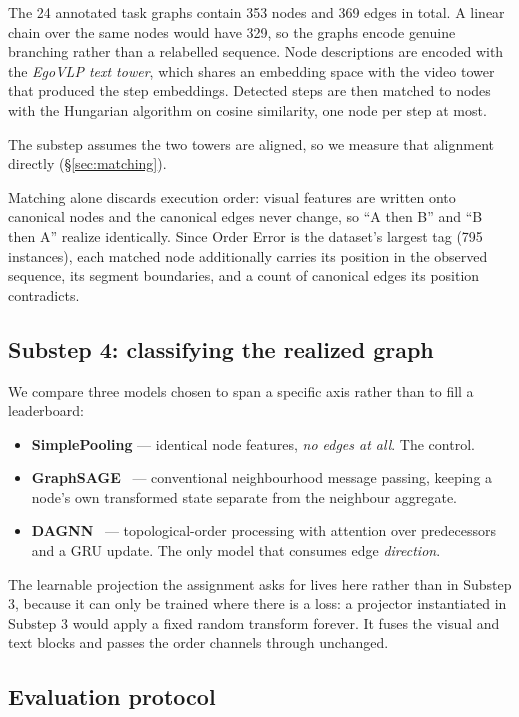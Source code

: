 \documentclass[10pt,twocolumn,letterpaper]{article}
\begin{document}
The 24 annotated task graphs contain 353 nodes and 369 edges in total. A linear
chain over the same nodes would have 329, so the graphs encode genuine branching
rather than a relabelled sequence. Node descriptions are encoded with the
\emph{EgoVLP text tower}, which shares an embedding space with the video tower
that produced the step embeddings. Detected steps are then matched to nodes with
the Hungarian algorithm on cosine similarity, one node per step at most.

The substep assumes the two towers are aligned, so we measure that alignment
directly (\S\ref{sec:matching}).

Matching alone discards execution order: visual features are written onto canonical
nodes and the canonical edges never change, so ``A then B'' and ``B then A'' realize
identically. Since Order Error is the dataset's largest tag (795 instances), each
matched node additionally carries its position in the observed sequence, its segment
boundaries, and a count of canonical edges its position contradicts.

\subsection{Substep 4: classifying the realized graph}

We compare three models chosen to span a specific axis rather than to fill a
leaderboard:

\begin{itemize}
\itemsep0.15em
\item \textbf{SimplePooling} --- identical node features, \emph{no edges at all}.
The control.
\item \textbf{GraphSAGE}~\cite{hamilton2017graphsage} --- conventional
neighbourhood message passing, keeping a node's own transformed state separate from
the neighbour aggregate.
\item \textbf{DAGNN}~\cite{thost2021dagnn} --- topological-order processing with
attention over predecessors and a GRU update. The only model that consumes edge
\emph{direction}.
\end{itemize}

The learnable projection the assignment asks for lives here rather than in Substep
3, because it can only be trained where there is a loss: a projector instantiated
in Substep 3 would apply a fixed random transform forever. It fuses the visual and
text blocks and passes the order channels through unchanged.

\subsection{Evaluation protocol}
\label{sec:protocol}
\end{document}
